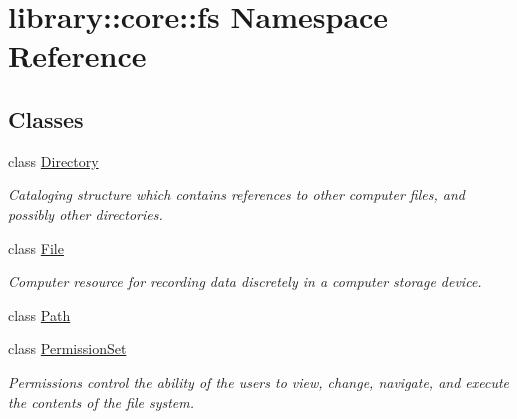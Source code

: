 \hypertarget{namespacelibrary_1_1core_1_1fs}{}\section{library\+:\+:core\+:\+:fs Namespace Reference}
\label{namespacelibrary_1_1core_1_1fs}
\subsection*{Classes}
\begin{DoxyCompactItemize}
\item 
class \hyperlink{classlibrary_1_1core_1_1fs_1_1_directory}{Directory}
\begin{DoxyCompactList}\small\item\em Cataloging structure which contains references to other computer files, and possibly other directories. \end{DoxyCompactList}\item 
class \hyperlink{classlibrary_1_1core_1_1fs_1_1_file}{File}
\begin{DoxyCompactList}\small\item\em Computer resource for recording data discretely in a computer storage device. \end{DoxyCompactList}\item 
class \hyperlink{classlibrary_1_1core_1_1fs_1_1_path}{Path}
\item 
class \hyperlink{classlibrary_1_1core_1_1fs_1_1_permission_set}{Permission\+Set}
\begin{DoxyCompactList}\small\item\em Permissions control the ability of the users to view, change, navigate, and execute the contents of the file system. \end{DoxyCompactList}\end{DoxyCompactItemize}
